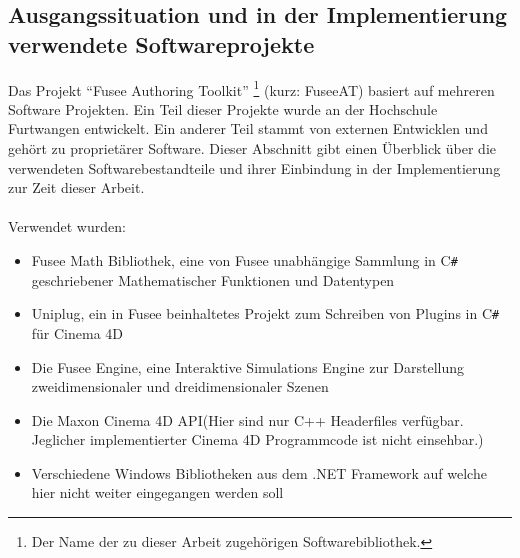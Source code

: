 \documentclass[pagesize, paper=a4, fontsize=12pt, titlepage=true, headings=small, headnosepline, abstractoff, liststotoc, nochapterprefix, plainheadsepline, twoside]{scrreprt}
\newcommand{\CSS}{C\texttt{\# }}
\begin{document}
\subsection{Ausgangssituation und in der Implementierung verwendete Softwareprojekte}
Das Projekt “Fusee Authoring Toolkit” \footnote{Der Name der zu dieser Arbeit zugehörigen Softwarebibliothek.} (kurz: FuseeAT) basiert auf mehreren Software Projekten. Ein Teil dieser Projekte wurde an der Hochschule Furtwangen entwickelt. Ein anderer Teil stammt von externen Entwicklen und gehört zu proprietärer Software. Dieser Abschnitt gibt einen Überblick über die verwendeten Softwarebestandteile und ihrer Einbindung in der Implementierung zur Zeit dieser Arbeit.
\\
\\
Verwendet wurden:
\begin{itemize}
\item Fusee Math Bibliothek, eine von Fusee unabhängige Sammlung in \CSS geschriebener Mathematischer Funktionen und Datentypen
\item Uniplug, ein in Fusee beinhaltetes Projekt zum Schreiben von Plugins in \CSS für Cinema 4D
\item Die Fusee Engine, eine Interaktive Simulations Engine zur Darstellung zweidimensionaler und dreidimensionaler Szenen
\item Die Maxon Cinema 4D API(Hier sind nur C++ Headerfiles verfügbar. Jeglicher implementierter Cinema 4D Programmcode ist nicht einsehbar.)
\item Verschiedene Windows Bibliotheken aus dem .NET Framework auf welche hier nicht weiter eingegangen werden soll
\end{itemize}
\end{document}
